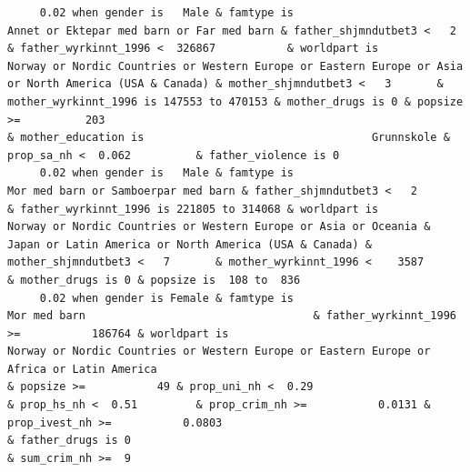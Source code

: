 \documentclass[
  letterpaper,
  DIV=11,
  numbers=noendperiod]{scrreprt}
\begin{document}
\begin{verbatim}
     0.02 when gender is   Male & famtype is                        Annet or Ektepar med barn or Far med barn & father_shjmndutbet3 <   2       & father_wyrkinnt_1996 <  326867           & worldpart is                              Norway or Nordic Countries or Western Europe or Eastern Europe or Asia or North America (USA & Canada) & mother_shjmndutbet3 <   3       & mother_wyrkinnt_1996 is 147553 to 470153 & mother_drugs is 0 & popsize >=          203                                                                                                                                                                        & mother_education is                                   Grunnskole & prop_sa_nh <  0.062          & father_violence is 0                                                                                                               
     0.02 when gender is   Male & famtype is                              Mor med barn or Samboerpar med barn & father_shjmndutbet3 <   2       & father_wyrkinnt_1996 is 221805 to 314068 & worldpart is            Norway or Nordic Countries or Western Europe or Asia or Oceania & Japan or Latin America or North America (USA & Canada) & mother_shjmndutbet3 <   7       & mother_wyrkinnt_1996 <    3587           & mother_drugs is 0 & popsize is  108 to  836                                                                                                                                                                                                                                                                                                                                                                                                               
     0.02 when gender is Female & famtype is                                                     Mor med barn                                   & father_wyrkinnt_1996 >=           186764 & worldpart is                                           Norway or Nordic Countries or Western Europe or Eastern Europe or Africa or Latin America                                                                                                  & popsize >=           49 & prop_uni_nh <  0.29                                              & prop_hs_nh <  0.51         & prop_crim_nh >=           0.0131 & prop_ivest_nh >=           0.0803                                                                                                                          & father_drugs is 0                                                                        & sum_crim_nh >=  9

\end{verbatim}
\end{document}
